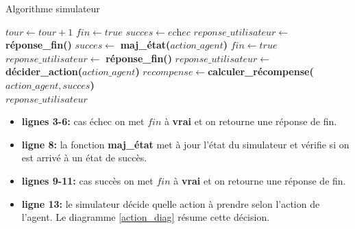 \begin{algorithm}[H]
	\caption{Algorithme simulateur}\label{euclid}
	\begin{algorithmic}[1]
		\State $tour \gets tour+1$
		\State $fin \gets \textit{true}$
		\State $succes \gets \textit{echec}$
		\State $reponse\_utilisateur \gets $ \textbf{réponse\_fin()}
		\Else
		\State $succes \gets$ \textbf{maj\_état(}$action\_agent$\textbf{)}
		\State $fin \gets \textit{true}$
		\State $reponse\_utilisateur \gets $ \textbf{réponse\_fin()}
		\Else 
		\State $reponse\_utilisateur \gets $ \textbf{décider\_action(}$action\_agent$\textbf{)}
		\EndIf
		\EndIf
		\State $recompense \gets $\textbf{calculer\_récompense(}$action\_agent, succes$\textbf{)}\\
		\Return $reponse\_utilisateur$
		\EndProcedure
		
	\end{algorithmic}
\end{algorithm}
\begin{itemize}
	\item \textbf{lignes 3-6:} cas échec on met $fin$ à \textbf{vrai} et on retourne une réponse de fin.
	\item \textbf{ligne 8:} la fonction \textbf{maj\_état} met à jour l'état du simulateur et vérifie si on est arrivé à un état de succès.
	\item \textbf{lignes 9-11:} cas succès on met $fin$ à \textbf{vrai} et on retourne une réponse de fin.
	\item \textbf{ligne 13:} le simulateur décide quelle action à prendre selon l'action de l'agent. Le diagramme \ref{action_diag} résume cette décision.
\end{itemize}

